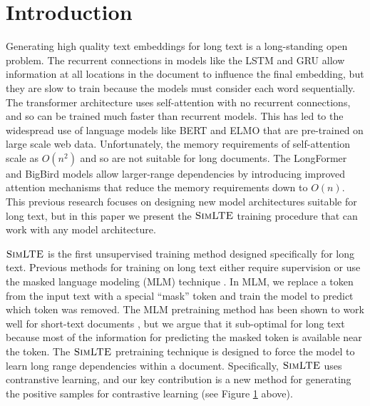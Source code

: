 \documentclass[11pt]{article}
\newcommand{\our}{\mbox{\textsc{SimLTE}}}
\begin{document}
\section{Introduction}
Generating high quality text embeddings for long text is a long-standing open problem.
The recurrent connections in models like the LSTM \cite{} and GRU \cite{} allow information at all locations in the document to influence the final embedding,
but they are slow to train because the models must consider each word sequentially.
The transformer architecture \cite{} uses self-attention with no recurrent connections,
and so can be trained much faster than recurrent models.
This has led to the widespread use of language models like BERT \cite{} and ELMO \cite{} that are pre-trained on large scale web data.
Unfortunately, the memory requirements of self-attention scale as $O(n^2)$ and so are not suitable for long documents.
The LongFormer \cite{} and BigBird \cite{} models allow larger-range dependencies by introducing improved attention mechanisms that reduce the memory requirements down to $O(n)$.
This previous research focuses on designing new model architectures suitable for long text,
but in this paper we present the $\our$ training procedure that can work with any model architecture.

$\our$ is the first unsupervised training method designed specifically for long text.
Previous methods for training on long text either require supervision \cite{} or use the masked language modeling (MLM) technique \cite{}.
In MLM, we replace a token from the input text with a special ``mask'' token and train the model to predict which token was removed.
The MLM pretraining method has been shown to work well for short-text documents \cite{},
but we argue that it sub-optimal for long text because most of the information for predicting the masked token is available near the token.
The $\our$ pretraining technique is designed to force the model to learn long range dependencies within a document.
Specifically, $\our$ uses contranstive learning,
and our key contribution is a new method for generating the positive samples for contrastive learning (see Figure \ref{} above).
\end{document}
